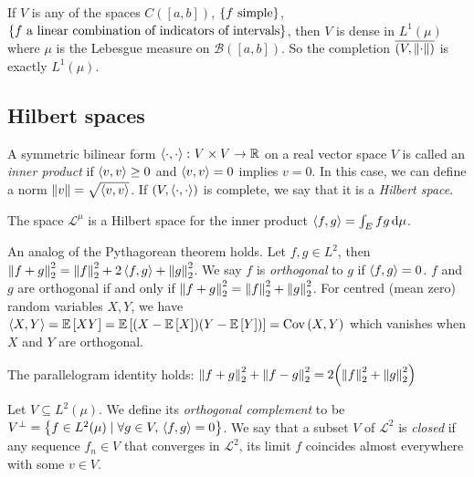 \begin{remark}
	If \( V \) is any of the spaces \( C([a,b]) \), \( \qty{f \text{ simple}} \), \( \qty{f \text{ a linear combination of indicators of intervals}} \), then \( V \) is dense in \( L^1(\mu) \) where \( \mu \) is the Lebesgue measure on \( \mathcal B([a,b]) \).
	So the completion \( \overline{(V,\norm{\cdot})} \) is exactly \( L^1(\mu) \).
\end{remark}

\subsection{Hilbert spaces}
\begin{definition}
	A symmetric bilinear form \( \left\langle{\cdot, \cdot}\right\rangle \colon V \times V \to \mathbb R \) on a real vector space \( V \) is called an \emph{inner product} if \( \left\langle{v,v}\right\rangle \geq 0 \) and \( \left\langle{v,v}\right\rangle = 0 \) implies \( v = 0 \).
	In this case, we can define a norm \( \norm{v} = \sqrt{\left\langle{v,v}\right\rangle} \).
	If \( (V,\left\langle{\cdot,\cdot}\right\rangle) \) is complete, we say that it is a \emph{Hilbert space}.
\end{definition}
\begin{corollary}
	The space \( \mathcal L^{\mu} \) is a Hilbert space for the inner product \( \left\langle{f,g}\right\rangle = \int_E fg \dd{\mu} \).
\end{corollary}
\begin{example}
	An analog of the Pythagorean theorem holds.
	Let \( f, g \in L^2 \), then \( \norm{f + g}_2^2 = \norm{f}_2^2 + 2\left\langle{f,g}\right\rangle + \norm{g}_2^2 \).
	We say \( f \) is \emph{orthogonal} to \( g \) if \( \left\langle{f,g}\right\rangle = 0 \).
	\( f \) and \( g \) are orthogonal if and only if \( \norm{f + g}_2^2 = \norm{f}_2^2 + \norm{g}_2^2 \).
	For centred (mean zero) random variables \( X, Y \), we have \( \left\langle{X,Y}\right\rangle = \mathbb{E}\left[{XY}\right] = \mathbb{E}\left[{(X - \mathbb{E}\left[{X}\right])(Y - \mathbb{E}\left[{Y}\right])}\right] = \operatorname{Cov}\left({X,Y}\right) \) which vanishes when \( X \) and \( Y \) are orthogonal.
\end{example}
\begin{example}
	The parallelogram identity holds: \( \norm{f+g}_2^2 + \norm{f-g}_2^2 = 2 \qty(\norm{f}_2^2 + \norm{g}_2^2) \)
\end{example}
\begin{definition}
	Let \( V \subseteq L^2(\mu) \).
	We define its \emph{orthogonal complement} to be \( V^\perp = \qty{f \in L^2(\mu) \mid \forall g \in V,\, \left\langle{f,g}\right\rangle = 0} \).
	We say that a subset \( V \) of \( \mathcal L^2 \) is \emph{closed} if any sequence \( f_n \in V \) that converges in \( \mathcal L^2 \), its limit \( f \) coincides almost everywhere with some \( v \in V \).
\end{definition}
